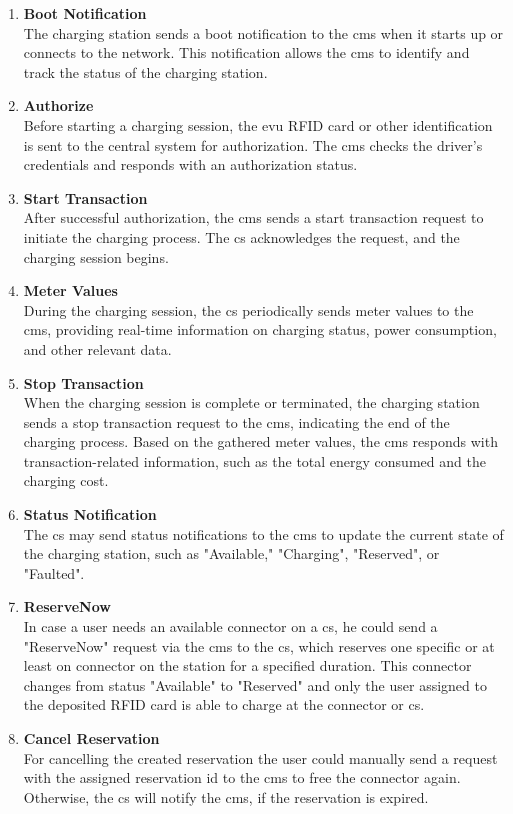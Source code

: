\begin{enumerate}
    \item \textbf{Boot Notification}\\The charging station sends a boot notification to the \acrshort{cms} when it starts up or connects to the network. This notification allows the \acrshort{cms} to identify and track the status of the charging station.
    \item \textbf{Authorize}\\Before starting a charging session, the \acrshort{evu} RFID card or other identification is sent to the central system for authorization. The \acrshort{cms} checks the driver's credentials and responds with an authorization status.
    \item \textbf{Start Transaction}\\After successful authorization, the \acrshort{cms} sends a start transaction request to initiate the charging process. The \acrshort{cs} acknowledges the request, and the charging session begins.
    \item \textbf{Meter Values}\\During the charging session, the \acrshort{cs} periodically sends meter values to the \acrshort{cms}, providing real-time information on charging status, power consumption, and other relevant data.
    \item \textbf{Stop Transaction}\\When the charging session is complete or terminated, the charging station sends a stop transaction request to the \acrshort{cms}, indicating the end of the charging process. Based on the gathered meter values, the \acrshort{cms} responds with transaction-related information, such as the total energy consumed and the charging cost.
    \item \textbf{Status Notification}\\The \acrshort{cs} may send status notifications to the \acrshort{cms} to update the current state of the charging station, such as "Available," "Charging", "Reserved", or "Faulted".
    \item \textbf{ReserveNow}\\In case a user needs an available connector on a \acrshort{cs}, he could send a "ReserveNow" request via the \acrshort{cms} to the \acrshort{cs}, which reserves one specific or at least on connector on the station for a specified duration. This connector changes from status "Available" to "Reserved" and only the user assigned to the deposited RFID card is able to charge at the connector or \acrshort{cs}.
    \item \textbf{Cancel Reservation}\\For cancelling the created reservation the user could manually send a request with the assigned reservation id to the \acrshort{cms} to free the connector again. Otherwise, the \acrshort{cs} will notify the \acrshort{cms}, if the reservation is expired.   
\end{enumerate}

